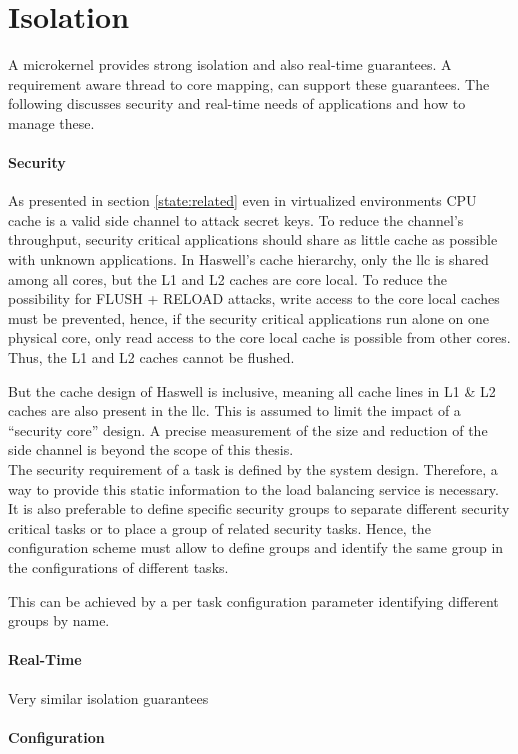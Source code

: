 \section{Isolation}
\label{design:isolation}

A microkernel provides strong isolation and also real-time guarantees.
A requirement aware thread to core mapping, can support these guarantees.
The following discusses security and real-time needs of applications and how to
manage these.

\paragraph{Security}
As presented in section \ref{state:related} even in virtualized environments
CPU cache is a valid side channel to attack secret keys.
To reduce the channel's throughput, security critical applications should share
as little cache as possible with unknown applications.
In Haswell's cache hierarchy, only the \gls{llc} is shared among all cores, but
the L1 and L2 caches are core local.
To reduce the possibility for FLUSH + RELOAD attacks, write access to the core
local caches must be prevented, hence, if the security critical applications
run alone on one physical core, only read access to the core local cache is
possible from other cores.
Thus, the L1 and L2 caches cannot be flushed.

But the cache design of Haswell is inclusive, meaning all cache lines in L1 \&
L2 caches are also present in the \gls{llc}.
This is assumed to limit the impact of a ``security core'' design.
A precise measurement of the size and reduction of the side channel is beyond
the scope of this thesis.
\\

The security requirement of a task is defined by the system design.
Therefore, a way to provide this static information to the load balancing
service is necessary.
It is also preferable to define specific security groups to separate different
security critical tasks or to place a group of related security tasks.
Hence, the configuration scheme must allow to define groups and identify the
same group in the configurations of different tasks.

This can be achieved by a per task configuration parameter identifying
different groups by name.

\paragraph{Real-Time}
Very similar isolation guarantees 

\paragraph{Configuration}
